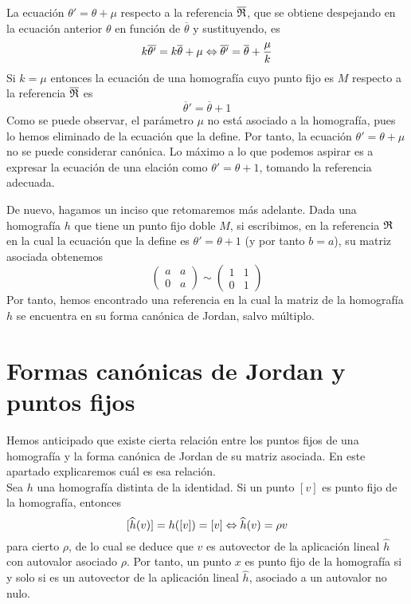 La ecuación $\theta'=\theta+\mu$ respecto a la referencia $\overline{\mathfrak{R}}$, que se obtiene despejando en la ecuación anterior $\theta$ en función de $\overline{\theta}$ y sustituyendo, es
\begin{equation*}
	k\overline{\theta'}=k\overline{\theta}+\mu\Leftrightarrow \overline{\theta'}=\overline{\theta}+\frac{\mu}{k}
\end{equation*}
Si $k=\mu$ entonces la ecuación de una homografía cuyo punto fijo es $M$ respecto a la referencia $\overline{\mathfrak{R}}$ es
\begin{equation*}
	\overline{\theta}'=\overline{\theta}+1
\end{equation*}
Como se puede observar, el parámetro $\mu$ no está asociado a la homografía, pues lo hemos eliminado de la ecuación que la define. Por tanto, la ecuación $\theta'=\theta+\mu$ no se puede considerar canónica. Lo máximo a lo que podemos aspirar es a expresar la ecuación de una elación como $\theta'=\theta+1$, tomando la referencia adecuada.

De nuevo, hagamos un inciso que retomaremos más adelante. Dada una homografía $h$ que tiene un punto fijo doble $M$, si escribimos, en la referencia $\mathfrak{R}$ en la cual la ecuación que la define es $\theta'=\theta+1$ (y por tanto $b=a$), su matriz asociada obtenemos
\begin{equation*}
\left( \begin{array}{cc}
a&a\\
0&a
\end{array}\right) 
\sim \left( \begin{array}{cc}
1&1\\
0&1
\end{array}\right) 
\end{equation*}
Por tanto, hemos encontrado una referencia en la cual la matriz de la homografía $h$ se encuentra en su forma canónica de Jordan, salvo múltiplo.

\section{Formas canónicas de Jordan y puntos fijos}
Hemos anticipado que existe cierta relación entre los puntos fijos de una homografía y la forma canónica de Jordan de su matriz asociada. En este apartado explicaremos cuál es esa relación.\\

Sea $h$ una homografía distinta de la identidad. Si un punto $[v]$ es punto fijo de la homografía, entonces 
\begin{equation}
	\label{C6_eq_puntofijo_autovector}
	[\widehat{h}(v)]=h([v])=[v]\Leftrightarrow \widehat{h}(v)=\rho v
\end{equation}
para cierto $\rho$, de lo cual se deduce que $v$ es autovector de la aplicación lineal $\widehat{h}$ con autovalor asociado $\rho$. Por tanto, un punto $x$ es punto fijo de la homografía si y solo si es un autovector de la aplicación lineal $\widehat{h}$, asociado a un autovalor no nulo.

